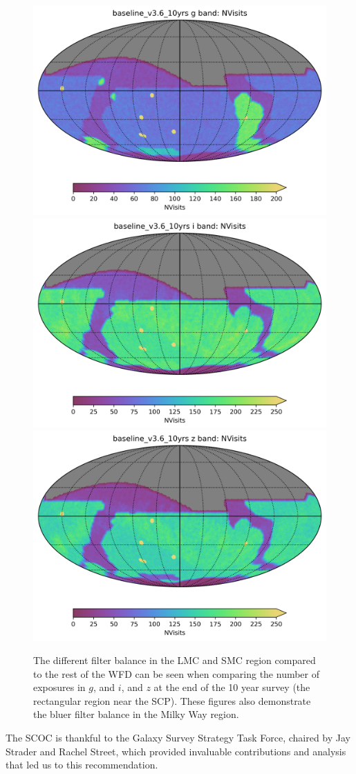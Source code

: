 \begin{figure}
    \centering    \includegraphics[width=0.32\linewidth]{figures/baseline_v3_6_10yrs_NVisits_g_band_HEAL_SkyMap.png}\includegraphics[width=0.32\linewidth]{figures/baseline_v3_6_10yrs_NVisits_i_band_HEAL_SkyMap.png}\includegraphics[width=0.32\linewidth]{figures/baseline_v3_6_10yrs_NVisits_z_band_HEAL_SkyMap.png}
    \caption{The different filter balance in the LMC and SMC region compared to the rest of the WFD can be seen when comparing the number of exposures in $g$, and $i$, and $z$ at the end of the 10 year survey (the rectangular region near the SCP). These figures also demonstrate the bluer filter
    balance in the Milky Way region.}
    \label{fig:enter-label}
\end{figure}

The SCOC is thankful to the Galaxy Survey Strategy Task Force, chaired by Jay Strader and Rachel Street, which provided invaluable contributions and analysis that led us to this recommendation.







